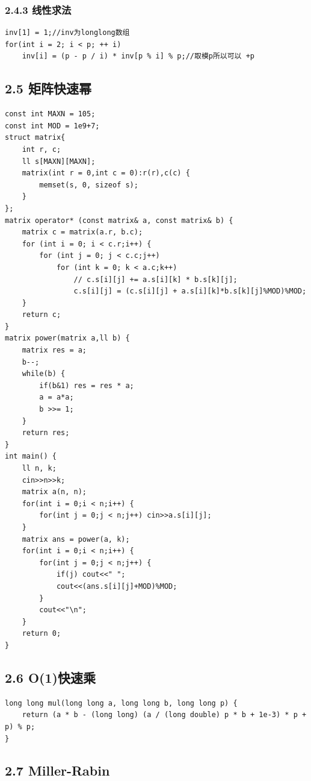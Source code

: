 \documentclass[11pt]{article}		%
\begin{document}
\subsubsection{2.4.3 线性求法}\label{ux7ebfux6027ux6c42ux6cd5}

\begin{verbatim}
inv[1] = 1;//inv为longlong数组
for(int i = 2; i < p; ++ i)
    inv[i] = (p - p / i) * inv[p % i] % p;//取模p所以可以 +p
\end{verbatim}

\subsection{2.5 矩阵快速幂}\label{ux77e9ux9635ux5febux901fux5e42}

\begin{verbatim}
const int MAXN = 105;
const int MOD = 1e9+7;
struct matrix{
    int r, c;
    ll s[MAXN][MAXN];
    matrix(int r = 0,int c = 0):r(r),c(c) {
        memset(s, 0, sizeof s);
    }
};
matrix operator* (const matrix& a, const matrix& b) {
    matrix c = matrix(a.r, b.c);
    for (int i = 0; i < c.r;i++) {
        for (int j = 0; j < c.c;j++)
            for (int k = 0; k < a.c;k++)
                // c.s[i][j] += a.s[i][k] * b.s[k][j];
                c.s[i][j] = (c.s[i][j] + a.s[i][k]*b.s[k][j]%MOD)%MOD;
    }
    return c;
}
matrix power(matrix a,ll b) {
    matrix res = a;
    b--;
    while(b) {
        if(b&1) res = res * a;
        a = a*a;
        b >>= 1;
    }
    return res;
}
int main() {
    ll n, k;
    cin>>n>>k;
    matrix a(n, n);
    for(int i = 0;i < n;i++) {
        for(int j = 0;j < n;j++) cin>>a.s[i][j];
    }
    matrix ans = power(a, k);
    for(int i = 0;i < n;i++) {
        for(int j = 0;j < n;j++) {
            if(j) cout<<" ";
            cout<<(ans.s[i][j]+MOD)%MOD;
        }
        cout<<"\n";
    }
    return 0;
}
\end{verbatim}

\subsection{2.6 O(1)快速乘}\label{o1ux5febux901fux4e58}

\begin{verbatim}
long long mul(long long a, long long b, long long p) {
    return (a * b - (long long) (a / (long double) p * b + 1e-3) * p + p) % p;
}
\end{verbatim}

\subsection{2.7 Miller-Rabin}\label{miller-rabin}
\end{document}

